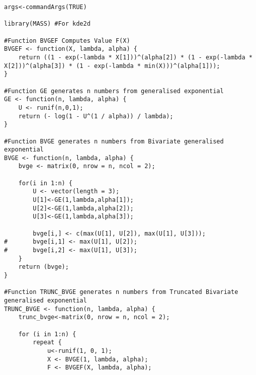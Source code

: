 \documentclass[11pt]{article}
\begin{document}
\begin{enumerate}


\begin{lstlisting}
args<-commandArgs(TRUE)

library(MASS) #For kde2d

#Function BVGEF Computes Value F(X)
BVGEF <- function(X, lambda, alpha) {
	return ((1 - exp(-lambda * X[1]))^(alpha[2]) * (1 - exp(-lambda * X[2]))^(alpha[3]) * (1 - exp(-lambda * min(X)))^(alpha[1]));
}

#Function GE generates n numbers from generalised exponential
GE <- function(n, lambda, alpha) {
	U <- runif(n,0,1);
	return (- log(1 - U^(1 / alpha)) / lambda);
}

#Function BVGE generates n numbers from Bivariate generalised exponential
BVGE <- function(n, lambda, alpha) {
	bvge <- matrix(0, nrow = n, ncol = 2);

	for(i in 1:n) {
		U <- vector(length = 3);
		U[1]<-GE(1,lambda,alpha[1]);
		U[2]<-GE(1,lambda,alpha[2]);
		U[3]<-GE(1,lambda,alpha[3]);		

		bvge[i,] <- c(max(U[1], U[2]), max(U[1], U[3]));
#		bvge[i,1] <- max(U[1], U[2]);
#		bvge[i,2] <- max(U[1], U[3]);
	}
	return (bvge);
}

#Function TRUNC_BVGE generates n numbers from Truncated Bivariate generalised exponential
TRUNC_BVGE <- function(n, lambda, alpha) {
	trunc_bvge<-matrix(0, nrow = n, ncol = 2);

	for (i in 1:n) {
		repeat {
			u<-runif(1, 0, 1);
			X <- BVGE(1, lambda, alpha);
			F <- BVGEF(X, lambda, alpha);


\end{lstlisting}
\end{enumerate}
\end{document}

